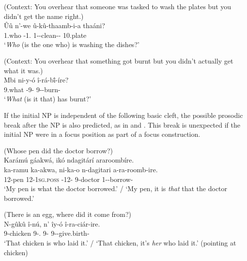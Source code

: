 \documentclass[output=paper]{langscibook}
\begin{document}
\ea
\label{bkm:Ref111724189}
(Context: You overhear that someone was tasked to wash the plates but you didn’t get the name right.)\\
\gll
Ûû  n’-we  û-kû-thaamb-i-a  thaáni?\\
1.who \COP{}-1.\PRO{} 1\RM-\PRS{}-clean-\IC{}-\FV{} 10.plate\\
\glt
‘\textit{Who} (is the one who) is washing the dishes?’

\ex
\label{bkm:Ref111724190}
(Context: You overhear that something got burnt but you didn’t actually get what it was.)\\
\gll
Mbi  ni-y-ó  î-rá-b\'{î}-íre?\\
9.what \COP{}-9-\PRO{} 9\SM-\YPST{}-burn-\PFV{}\\
\glt
‘\textit{What} (is it that) has burnt?’

\z


If the initial NP is independent of the following basic cleft, the possible prosodic break after the NP is also predicted, as in  and . This break is unexpected if the initial NP were in a focus position as part of a focus construction.

\ea
\label{bkm:Ref117504186}
(Whose pen did the doctor borrow?)\\
Karámú  gáakwá,  ikó  ndagitárí  araroombíre.\\
\gll
ka-ramu  ka-akwa,  ni-ka-o  n-dagitari  a-ra-roomb-ire.\\
12-pen \textsc{12-1sg.poss} \COP{}-12-\PRO{} 9-doctor 1\SM-\YPST{}-borrow-\PFV{}\\
\glt
‘My pen is what the doctor borrowed.’ / ‘My pen, it is \textit{that} that the doctor borrowed.’

\ex
\label{bkm:Ref111724334}
(There is an egg, where did it come from?)\\
\gll
N-gûkû   î-nú,  n’  îy-ó  î-ra-ciár-ire.\\
9-chicken  9-\DEM.\MED{} \FOC{} 9-\PRO{} 9\SM-\YPST{}-give.birth-\PFV{}\\
\glt
‘That chicken is who laid it.’ / ‘That chicken, it’s \textit{her} who laid it.’ (pointing at chicken)
\end{document}
